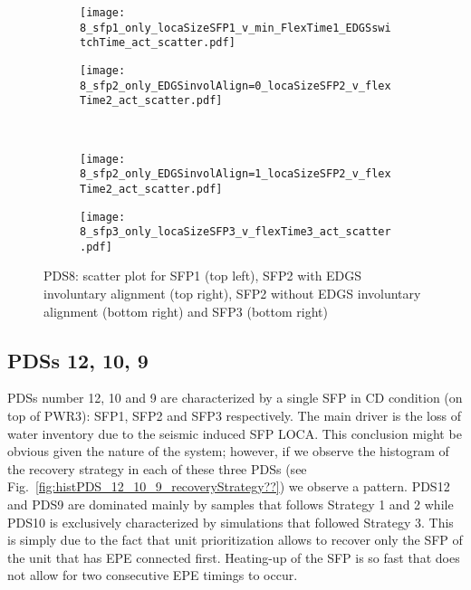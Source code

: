 \begin{figure}
  \begin{subfigure}{.5\linewidth}
    \centering
    \texttt{[image: 8\_sfp1\_only\_locaSizeSFP1\_v\_min\_FlexTime1\_EDGSswitchTime\_act\_scatter.pdf]}
  \end{subfigure}%
  \begin{subfigure}{.5\linewidth}
    \centering
    \texttt{[image: 8\_sfp2\_only\_EDGSinvolAlign=0\_locaSizeSFP2\_v\_flexTime2\_act\_scatter.pdf]}
  \end{subfigure}\\[1ex]
  \begin{subfigure}{.5\linewidth}
    \centering
    \texttt{[image: 8\_sfp2\_only\_EDGSinvolAlign=1\_locaSizeSFP2\_v\_flexTime2\_act\_scatter.pdf]}
  \end{subfigure}
  \begin{subfigure}{.5\linewidth}
    \centering
    \texttt{[image: 8\_sfp3\_only\_locaSizeSFP3\_v\_flexTime3\_act\_scatter.pdf]}
  \end{subfigure}
  \caption{PDS8: scatter plot for SFP1 (top left), SFP2 with EDGS involuntary alignment (top right), 
           SFP2 without EDGS involuntary alignment (bottom right) and SFP3 (bottom right)}
  \label{fig:scatterPDS8}
\end{figure}  

\subsection{PDSs 12, 10, 9}
PDSs number 12, 10 and 9 are characterized by a single SFP in CD condition (on top of PWR3): SFP1, 
SFP2 and SFP3 respectively. The main driver is the loss of water inventory due to the seismic induced
SFP LOCA.
This conclusion might be obvious given the nature of the system; however, if we observe the 
histogram of the recovery strategy in each of these three PDSs 
(see Fig.~\ref{fig:histPDS_12_10_9_recoveryStrategy??}) we observe a pattern.
PDS12 and PDS9 are dominated mainly by samples that follows Strategy 1 and 2 while PDS10 is 
exclusively characterized by simulations that followed Strategy 3.
This is simply due to the fact that unit prioritization allows to recover only the SFP of the unit
that has EPE connected first. Heating-up of the SFP is so fast that does not allow for two consecutive 
EPE timings to occur.

